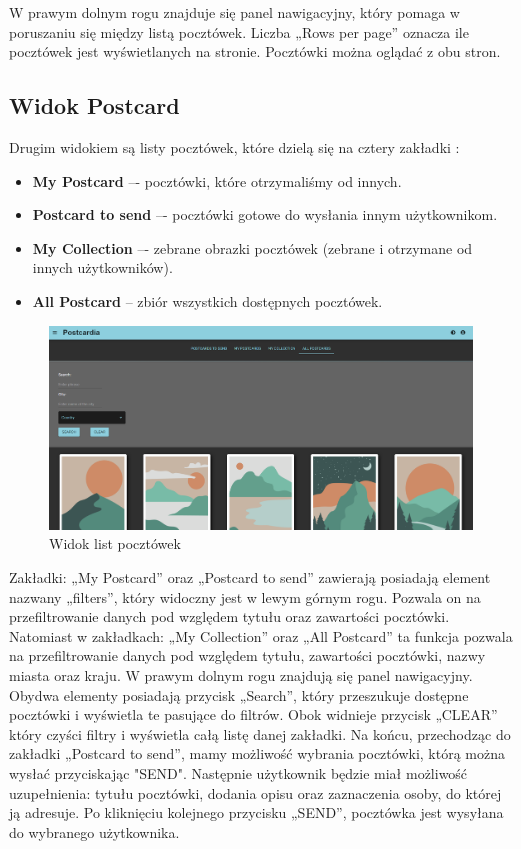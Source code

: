 \documentclass[a4paper,twoside,12pt]{book}
\begin{document}
W prawym dolnym rogu znajduje się panel nawigacyjny, który pomaga w poruszaniu się między listą pocztówek. Liczba „Rows per page” oznacza ile pocztówek jest wyświetlanych na stronie. Pocztówki można oglądać z obu stron.

\subsection{Widok Postcard}
Drugim widokiem są listy pocztówek, które dzielą się na cztery zakładki :
\begin{itemize}

\item \textbf{My Postcard} –- pocztówki, które otrzymaliśmy od innych.
\item \textbf{Postcard to send} –- pocztówki gotowe do wysłania innym użytkownikom.
\item \textbf{My Collection} –- zebrane obrazki pocztówek (zebrane i otrzymane od innych użytkowników).
\item \textbf{All Postcard} -- zbiór wszystkich dostępnych pocztówek. 
\newpage
\end{itemize}
\begin{figure}[H]
    \centering
    \includegraphics[width=1\textwidth]{webowka_ss/postcard.png}
    \caption{Widok list pocztówek}
\end{figure}
Zakładki: „My Postcard” oraz „Postcard to send” zawierają posiadają element nazwany „filters”, który widoczny jest w lewym górnym rogu. Pozwala on na przefiltrowanie danych pod względem tytułu oraz zawartości pocztówki.
Natomiast w zakładkach: „My Collection” oraz „All Postcard” ta funkcja pozwala na przefiltrowanie danych pod względem tytułu, zawartości pocztówki, nazwy miasta oraz kraju. W prawym dolnym rogu znajdują się panel nawigacyjny. Obydwa elementy posiadają przycisk „Search”, który przeszukuje dostępne pocztówki i wyświetla te pasujące do filtrów. Obok widnieje przycisk „CLEAR” który czyści filtry i wyświetla całą listę danej zakładki. Na końcu, przechodząc do zakładki „Postcard to send”, mamy możliwość wybrania pocztówki, którą można wysłać przyciskając "SEND". Następnie użytkownik będzie miał możliwość uzupełnienia: tytułu pocztówki, dodania opisu oraz zaznaczenia osoby, do której ją adresuje. Po kliknięciu kolejnego przycisku „SEND”, pocztówka jest wysyłana do wybranego użytkownika.
\newpage
\end{document}
